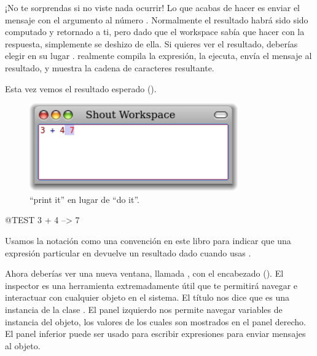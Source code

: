 \documentclass[a4paper,10pt,twoside]{book}
\begin{document}
¡No te sorprendas si no viste nada ocurrir! Lo que acabas de hacer es enviar el mensaje \ct{+} con el argumento  al n\'umero . Normalmente el resultado  habr\'a sido sido computado y retornado a ti, pero dado que el workspace sab\'ia que hacer con la respuesta, simplemente se deshizo de ella. Si quieres ver el resultado, deber\'ias elegir en su lugar .  realmente compila la expresi\'on, la ejecuta, env\'ia el mensaje  al resultado, y muestra la cadena de caracteres resultante.

Esta vez vemos el resultado esperado ().

\begin{figure}[htb]
\centerline {\includegraphics[width=0.8\textwidth]{PrintIt}}
\caption{``print it'' en lugar de ``do it''. }
\end{figure}

\begin{code}{@TEST}
3 + 4 --> 7
\end{code}
\noindent
Usamos la notaci\'on \ct{-->} como una convenci\'on en este libro para indicar que una expresi\'on particular en \pharo devuelve un resultado dado cuando usas .

\noindent
Ahora deber\'ias ver una nueva ventana, llamada , con el encabezado  ().
El inspector es una herramienta extremadamente \'util que te permitir\'a navegar e interactuar con cualquier objeto en el sistema.
El t\'itulo nos dice que  es una instancia de la clase .
El panel izquierdo nos permite navegar variables de instancia del objeto, los valores de los cuales son mostrados en el panel derecho.
El panel inferior puede ser usado para escribir expresiones para enviar mensajes al objeto.
\end{document}
